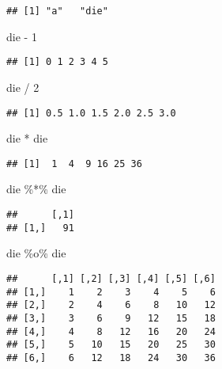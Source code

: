 \documentclass[
]{article}
\newenvironment{Shaded}{\begin{snugshade}}{\end{snugshade}}
\newcommand{\DecValTok}[1]{\textcolor[rgb]{0.00,0.00,0.81}{#1}}
\newcommand{\NormalTok}[1]{#1}
\newcommand{\SpecialCharTok}[1]{\textcolor[rgb]{0.00,0.00,0.00}{#1}}
\begin{document}
\begin{verbatim}
## [1] "a"   "die"
\end{verbatim}

\begin{Shaded}
\begin{Highlighting}[]
\NormalTok{die }\SpecialCharTok{{-}} \DecValTok{1}
\end{Highlighting}
\end{Shaded}

\begin{verbatim}
## [1] 0 1 2 3 4 5
\end{verbatim}

\begin{Shaded}
\begin{Highlighting}[]
\NormalTok{die }\SpecialCharTok{/} \DecValTok{2}
\end{Highlighting}
\end{Shaded}

\begin{verbatim}
## [1] 0.5 1.0 1.5 2.0 2.5 3.0
\end{verbatim}

\begin{Shaded}
\begin{Highlighting}[]
\NormalTok{die }\SpecialCharTok{*}\NormalTok{ die}
\end{Highlighting}
\end{Shaded}

\begin{verbatim}
## [1]  1  4  9 16 25 36
\end{verbatim}

\begin{Shaded}
\begin{Highlighting}[]
\NormalTok{die }\SpecialCharTok{\%*\%}\NormalTok{ die}
\end{Highlighting}
\end{Shaded}

\begin{verbatim}
##      [,1]
## [1,]   91
\end{verbatim}

\begin{Shaded}
\begin{Highlighting}[]
\NormalTok{die }\SpecialCharTok{\%o\%}\NormalTok{ die}
\end{Highlighting}
\end{Shaded}

\begin{verbatim}
##      [,1] [,2] [,3] [,4] [,5] [,6]
## [1,]    1    2    3    4    5    6
## [2,]    2    4    6    8   10   12
## [3,]    3    6    9   12   15   18
## [4,]    4    8   12   16   20   24
## [5,]    5   10   15   20   25   30
## [6,]    6   12   18   24   30   36
\end{verbatim}
\end{document}
